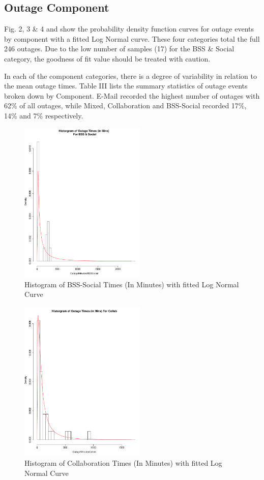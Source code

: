 \documentclass[conference]{IEEEtran}
\begin{document}
\subsection{Outage Component}

Fig. 2, 3 \& 4 and show the probability density function curves for outage events by component with a fitted Log Normal curve. These four categories total the full 246 outages. Due to the low number of samples (17) for the BSS \& Social category, the goodness of fit value should be treated with caution. \par

In each of the component categories, there is a degree of variability in relation to the mean outage times. Table III lists the summary statistics of outage events broken down by Component. E-Mail recorded the highest number of outages with 62\% of all outages, while Mixed, Collaboration and BSS-Social recorded 17\%, 14\% and 7\% respectively. 


\begin{figure}
\begin{center}
\includegraphics[width=6cm]{graph2.pdf} 
\caption{ Histogram of BSS-Social Times (In Minutes) with fitted Log Normal Curve}
\end{center}
\label{fig:outagedistribution}
\end{figure}


\begin{figure}
\begin{center}
\includegraphics[width=6cm]{graph3.pdf} 
\caption{ Histogram of Collaboration Times (In Minutes) with fitted Log Normal Curve}
\end{center}
\label{fig:outagedistribution}
\end{figure}
\end{document}
